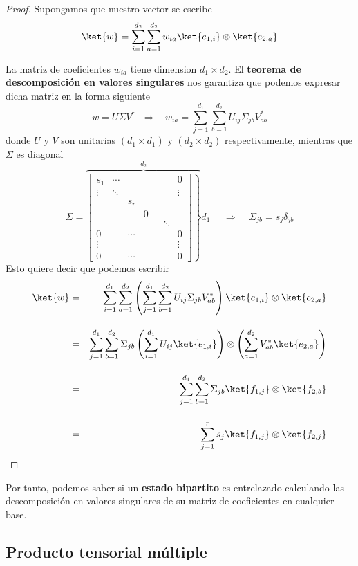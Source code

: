 \documentclass[a4paper,11pt]{book} %
\numberwithin{equation}{chapter}
\begin{document}
	\begin{proof}
Supongamos que nuestro vector se escribe
$$
\ket{w} = \sum_{i=1}^{d_2}\sum_{a=1}^{d_2} w_{ia} \ket{e_{1,i}}\otimes \ket{e_{2,a}}
$$
\vspace{0.3cm}

La matriz de coeficientes $w_{ia}$ tiene  dimension $d_1\times d_2$. El \textbf{teorema de descomposición en valores singulares} nos garantiza que podemos expresar dicha matriz en la forma siguiente
$$
w = U\Sigma V^\dagger ~~~\Rightarrow ~~~~w_{ia} = \sum_{j=1}^{d_1}\sum_{b=1}^{d_2} U_{ij}\Sigma_{jb}V_{ab}^*
$$
donde $U$ y $V$ son unitarias $(d_1\times d_1)$ y $(d_2\times d_2)$ respectivamente, mientras que $\Sigma$ es diagonal
$$
\Sigma = 
\overbrace{\left.
\begin{bmatrix}
s_1 &\cdots  &    &  & & &  0  \\  \vdots & \ddots & & & & & \vdots  \\  & & s_r & & & &  \\
   & &  & 0  & &  &    \\ & & & & & \ddots &  \\  0 & &\cdots  & & & & 0  \\ \vdots & &&&& & \vdots \\ 0 & & \cdots & & & & 0
\end{bmatrix}   \right\}  }^{\displaystyle d_2} d_1 ~~~~~~\Rightarrow ~~~~~ \Sigma_{jb} = s_j\delta_{jb}
$$
Esto quiere decir que podemos escribir
\begin{eqnarray*}
\ket{w} &=& \sum_{i=1}^{d_1}\sum_{a=1}^{d_2}\left( \sum_{j=1}^{d_1}\sum_{b=1}^{d_2} U_{ij}\Sigma_{jb}V_{ab}^* \right)\ket{e_{1,i}}\otimes \ket{e_{2,a}}
\\  \rule{0mm}{10mm}
&=& \sum_{j=1}^{d_1}\sum_{b=1}^{d_2}\Sigma_{jb}\left( \sum_{i=1}^{d_1} U_{ij}\ket{e_{1,i}} \right)\otimes  \left( \sum_{a=1}^{d_2} V_{ab}^* \ket{e_{2,a}}\right)
\\   \rule{0mm}{10mm}
&=& \sum_{j=1}^{d_1}\sum_{b=1}^{d_2}\Sigma_{jb} \ket{f_{1,j}}\otimes \ket{f_{2,b}}\\   \rule{0mm}{10mm}
&=& \sum_{j=1}^r s_j \ket{f_{1,j}}\otimes \ket{f_{2,j}}
\end{eqnarray*}
	\end{proof}
Por tanto, podemos saber si un \textbf{estado bipartito} es entrelazado calculando las descomposición en valores singulares de su matriz de coeficientes en cualquier base. 


		\subsection{Producto tensorial múltiple}
\end{document}
